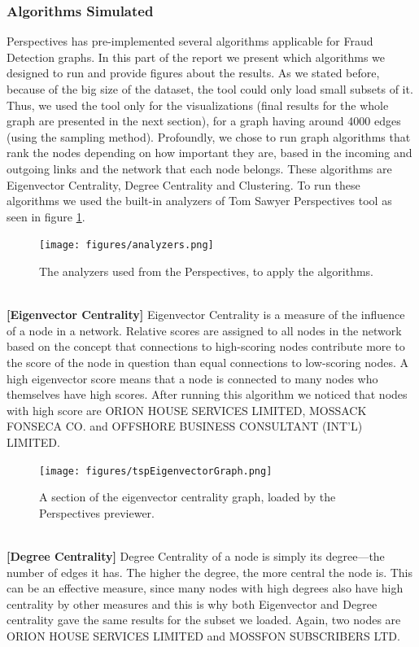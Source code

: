 \documentclass[sigconf, nonacm]{acmart}
\begin{document}
\subsubsection{Algorithms Simulated} 
Perspectives has pre-implemented several algorithms applicable for Fraud Detection graphs. In this part of the report we present which algorithms we designed to run and provide figures about the results. As we stated before, because of the big size of the dataset, the tool could only load small subsets of it. Thus, we used the tool only for the visualizations (final results for the whole graph are presented in the next section), for a graph having around 4000 edges (using the sampling method). Profoundly, we chose to run graph algorithms that rank the nodes depending on how important they are, based in the incoming and outgoing links and the network that each node belongs. These algorithms are Eigenvector Centrality, Degree Centrality and Clustering. To run these algorithms we used the built-in analyzers of Tom Sawyer Perspectives tool as seen in figure \ref{fig:analyzersTSP}.\\
\begin{figure}[htp]
    \centering
    \texttt{[image: figures/analyzers.png]}
    \caption{The analyzers used from the Perspectives, to apply the algorithms.}
    \label{fig:analyzersTSP}
\end{figure}
\\
\textbf{[Eigenvector Centrality]} 
Eigenvector Centrality is a measure of the influence of a node in a network. Relative scores are assigned to all nodes in the network based on the concept that connections to high-scoring nodes contribute more to the score of the node in question than equal connections to low-scoring nodes. A high eigenvector score means that a node is connected to many nodes who themselves have high scores. After running this algorithm we noticed that nodes with high score are ORION HOUSE SERVICES LIMITED, MOSSACK FONSECA CO. and OFFSHORE BUSINESS CONSULTANT (INT'L) LIMITED.
\begin{figure}[htp]
    \centering
    \texttt{[image: figures/tspEigenvectorGraph.png]}
    \caption{A section of the eigenvector centrality graph, loaded by the Perspectives previewer.}
    \label{fig:clusterGraph}
\end{figure}\\
\textbf{[Degree Centrality]} 
Degree Centrality of a node is simply its degree—the number of edges it has. The higher the degree, the more central the node is. This can be an effective measure, since many nodes with high degrees also have high centrality by other measures and this is why both Eigenvector and Degree centrality gave the same results for the subset we loaded. Again, two  nodes are ORION HOUSE SERVICES LIMITED and MOSSFON SUBSCRIBERS LTD.
\end{document}
